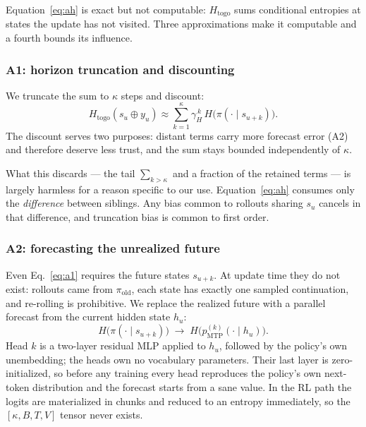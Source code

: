 \documentclass[11pt]{article}
\newcommand{\Htogo}{H_{\mathrm{togo}}}
\begin{document}
Equation~\eqref{eq:ah} is exact but not computable: $\Htogo$ sums conditional
entropies at states the update has not visited. Three approximations make it
computable and a fourth bounds its influence.

\subsubsection{A1: horizon truncation and discounting}

We truncate the sum to $\kappa$ steps and discount:
%
\begin{equation}
\Htogo(s_u \oplus y_u) \approx
\sum_{k=1}^{\kappa} \gamma_H^{\,k}\, H\bigl(\pi(\cdot \mid s_{u+k})\bigr).
\label{eq:a1}
\end{equation}
%
The discount serves two purposes: distant terms carry more forecast error (A2) and
therefore deserve less trust, and the sum stays bounded independently of $\kappa$.

What this discards --- the tail $\sum_{k > \kappa}$ and a fraction of the retained
terms --- is largely harmless for a reason specific to our use. Equation~\eqref{eq:ah}
consumes only the \emph{difference} between siblings. Any bias common to rollouts
sharing $s_u$ cancels in that difference, and truncation bias is common to first
order.

\subsubsection{A2: forecasting the unrealized future}

Even Eq.~\eqref{eq:a1} requires the future states $s_{u+k}$. At update time they do
not exist: rollouts came from $\pi_{\mathrm{old}}$, each state has exactly one
sampled continuation, and re-rolling is prohibitive. We replace the realized future
with a parallel forecast from the current hidden state $h_u$:
%
\begin{equation}
H\bigl(\pi(\cdot \mid s_{u+k})\bigr) \;\longrightarrow\;
H\bigl(p^{(k)}_{\mathrm{MTP}}(\cdot \mid h_u)\bigr).
\label{eq:a2}
\end{equation}
%
Head $k$ is a two-layer residual MLP applied to $h_u$, followed by the policy's own
unembedding; the heads own no vocabulary parameters. Their last layer is
zero-initialized, so before any training every head reproduces the policy's own
next-token distribution and the forecast starts from a sane value. In the RL path the
logits are materialized in chunks and reduced to an entropy immediately, so the
$[\kappa, B, T, V]$ tensor never exists.
\end{document}
